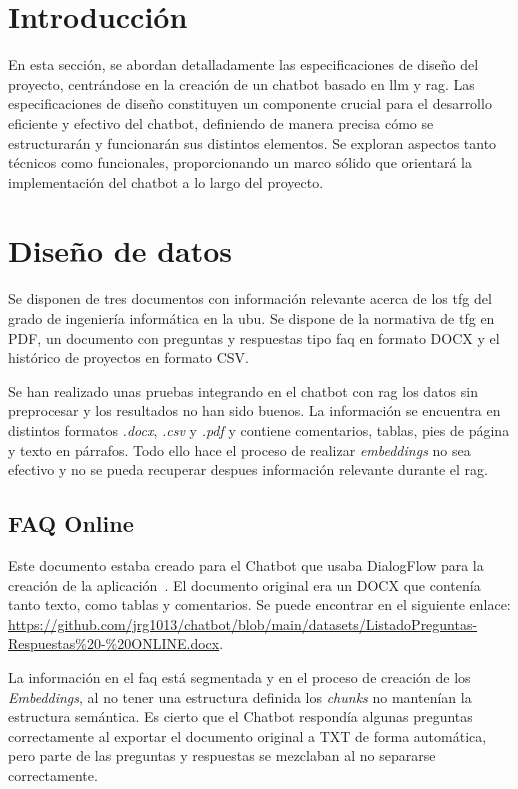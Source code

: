 
\section{Introducción}

En esta sección, se abordan detalladamente las especificaciones de diseño del proyecto, centrándose en la creación de un chatbot basado en \acrlong{llm} y \acrlong{rag}. Las especificaciones de diseño constituyen un componente crucial para el desarrollo eficiente y efectivo del chatbot, definiendo de manera precisa cómo se estructurarán y funcionarán sus distintos elementos. Se exploran aspectos tanto técnicos como funcionales, proporcionando un marco sólido que orientará la implementación del chatbot a lo largo del proyecto.

\section{Diseño de datos}

Se disponen de tres documentos con información relevante acerca de los \acrshort{tfg} del grado de ingeniería informática en la \acrshort{ubu}. Se dispone de la normativa de \acrlong{tfg} en PDF, un documento con preguntas y respuestas tipo \acrshort{faq} en formato DOCX y el histórico de proyectos en formato CSV.

Se han realizado unas pruebas integrando en el chatbot con \acrshort{rag} los datos sin preprocesar y los resultados no han sido buenos. La información se encuentra en distintos formatos \textit{.docx}, \textit{.csv} y \textit{.pdf} y contiene  comentarios, tablas, pies de página y texto en párrafos. Todo ello hace el proceso de realizar \textit{embeddings} no sea efectivo  y no se pueda recuperar despues información relevante durante el \acrshort{rag}.

\subsection{FAQ Online}

Este documento estaba creado para el Chatbot que usaba DialogFlow para la creación de la aplicación~\cite{UBU-Chatbot}. El documento original era un DOCX que contenía tanto texto, como tablas y comentarios. Se puede encontrar en el siguiente enlace: \url{https://github.com/jrg1013/chatbot/blob/main/datasets/ListadoPreguntas-Respuestas%20-%20ONLINE.docx}.

La información en el \acrshort{faq} está segmentada y en el proceso de creación de los \textit{Embeddings}, al no tener una estructura definida los \textit{chunks} no mantenían la estructura semántica. Es cierto que el Chatbot respondía algunas preguntas correctamente al exportar el documento original a TXT de forma automática, pero parte de las preguntas y respuestas se mezclaban al no separarse correctamente.

